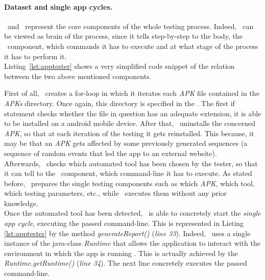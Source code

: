 \paragraph{Dataset and single app cycles. } 
\AppTester\ and \Cmd\ represent the core components of the whole testing process. Indeed, \AppTester\ can be viewed as brain of the process, since it tells step-by-step to the body, \ie the \Cmd\ component, which commands it has to execute and at what stage of the process it has to perform it. \\
Listing~\ref{lst:apptester} shows a very simplified code snippet of the relation between the two above mentioned components. 


First of all, \AppTester\ creates a for-loop in which it iterates each \textit{APK} file contained in the \textit{APKs} directory. Once again, this directory is specified in the \Config. 
The first if statement checks whether the file in question has an adequate extension, \ie it is able to be installed on a android mobile device. 
After that, \AppTester\ uninstalls the concerned \textit{APK}, so that at each iteration of the testing it gets reinstalled. 
This because, it may be that an \textit{APK} gets affected by some previously generated sequences (\eg a sequence of random events that led the app to an external website). \\
Afterwards, \AppTester\ checks which automated tool has been chosen by the tester, so that it can tell to the \Cmd\ component, which command-line it has to execute. As stated before, \AppTester\ prepares the single testing components such as which \textit{APK}, which tool, which testing parameters, etc., while \Cmd\ executes them without any prior knowledge. \\
Once the automated tool has been detected, \Cmd\ is able to concretely start the \textit{single app cycle}, executing the passed command-line. This is represented in Listing \ref{lst:apptester} by the method \textit{generateReport()} (\textit{line 33}). Indeed, \Cmd\ uses a single instance of the java-class \textit{Runtime} that allows the application to interact with the environment in which the app is running \cite{runtime}. 
This is actually achieved by the \textit{Runtime.getRuntime()} (\textit{line 34}). The next line concretely executes the passed command-line. 

